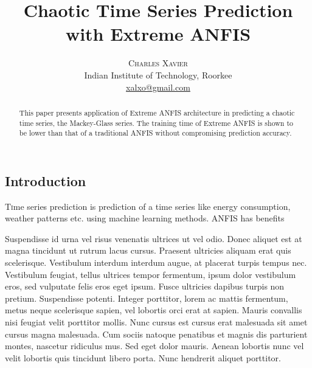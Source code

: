 \documentclass[twoside]{article}
\title{
	\fontsize{24pt}{30pt}\selectfont
	\textbf{Chaotic Time Series Prediction with Extreme ANFIS}
	}
\author{%
	\large
	\textsc{Charles Xavier}\\[2mm]
	\normalsize	Indian Institute of Technology, Roorkee \\
	\normalsize	\href{mailto:xavier@gmail.com}{xalxo@gmail.com}
	}
\date{}
\begin{document}
\maketitle

\begin{abstract}
\noindent This paper presents application of Extreme ANFIS architecture in predicting a chaotic time series, the Mackey-Glass series. The training time of Extreme ANFIS is shown to be lower than that of a traditional ANFIS without compromising prediction accuracy.
\end{abstract}
	

\begin{multicols}{2}
\section{Introduction}
\lettrine[nindent=0em,lines=3]{T} ime series prediction is prediction of a time series like energy consumption, weather patterns etc. using machine learning methods. ANFIS has benefits 

Suspendisse id urna vel risus venenatis ultrices ut vel odio. Donec aliquet est at magna tincidunt ut rutrum lacus cursus. Praesent ultricies aliquam erat quis scelerisque. Vestibulum interdum interdum augue, at placerat turpis tempus nec. Vestibulum feugiat, tellus ultrices tempor fermentum, ipsum dolor vestibulum eros, sed vulputate felis eros eget ipsum. Fusce ultricies dapibus turpis non pretium. Suspendisse potenti. Integer porttitor, lorem ac mattis fermentum, metus neque scelerisque sapien, vel lobortis orci erat at sapien. Mauris convallis nisi feugiat velit porttitor mollis. Nunc cursus est cursus erat malesuada sit amet cursus magna malesuada. Cum sociis natoque penatibus et magnis dis parturient montes, nascetur ridiculus mus. Sed eget dolor mauris. Aenean lobortis nunc vel velit lobortis quis tincidunt libero porta. Nunc hendrerit aliquet porttitor.


\end{multicols}
\end{document}
